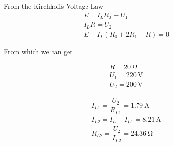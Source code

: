 \documentclass{article}
\begin{document}
From the Kirchhoffs Voltage Law
\begin{equation*}
  \begin{aligned}
    E - I_L R_0 = U_1 \\
    I_L R = U_2 \\
    E - I_L \left( R_0 + 2 R_1 + R \right) = 0
  \end{aligned}
\end{equation*}

From which we can get

\begin{equation*}
  \begin{aligned}
    R = 20 \  \mathrm{\Omega} \\
    U_1 = 220 \  \mathrm{V} \\
    U_2 = 200 \  \mathrm{V}
  \end{aligned}
\end{equation*}

\begin{equation*}
  \begin{aligned}
    I_{L1} = \dfrac{U_2}{R_{L1}} = 1.79 \  \mathrm{A} \\
    I_{L2} = I_L - I_{L1} = 8.21 \  \mathrm{A} \\
    R_{L2} = \dfrac{U_2}{I_{L2}} = 24.36 \  \mathrm{\Omega} 
  \end{aligned}
\end{equation*}
\end{document}
